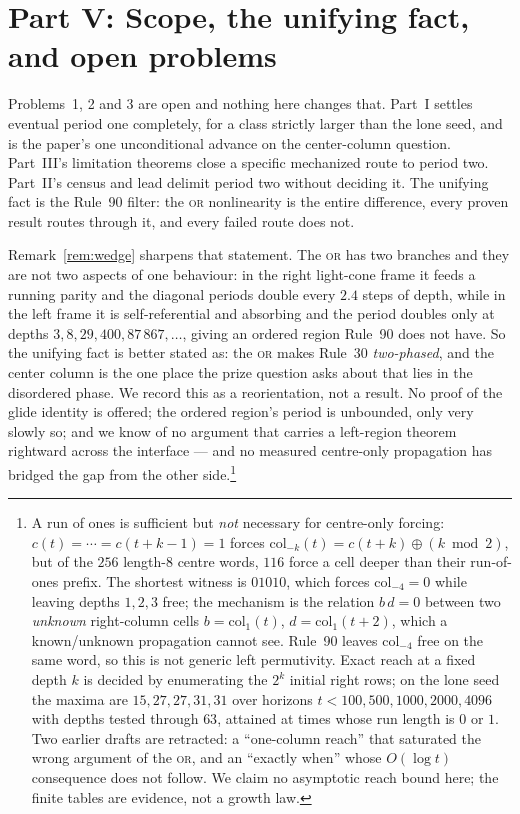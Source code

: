 \documentclass[11pt]{article}
\theoremstyle{definition}
\begin{document}
\section{Part V: Scope, the unifying fact, and open problems}
\label{sec:scope}

Problems~1, 2 and 3 are open and nothing here changes that. Part~I settles
eventual period one completely, for a class strictly larger than the lone seed,
and is the paper's one unconditional advance on the center-column question.
Part~III's limitation theorems close a specific mechanized route to period two.
Part~II's census and lead delimit period two without deciding it. The unifying
fact is the Rule~90 filter: the \textsc{or} nonlinearity is the entire
difference, every proven result routes through it, and every failed route does
not.

Remark~\ref{rem:wedge} sharpens that statement. The \textsc{or} has two branches
and they are not two aspects of one behaviour: in the right light-cone frame it
feeds a running parity and the diagonal periods double every $2.4$ steps of
depth, while in the left frame it is self-referential and absorbing and the
period doubles only at depths $3,8,29,400,87\,867,\ldots$, giving an ordered
region Rule~90 does not have. So the unifying fact is better stated as: the
\textsc{or} makes Rule~30 \emph{two-phased}, and the center column is the one
place the prize question asks about that lies in the disordered phase. We record
this as a reorientation, not a result. No proof of the glide identity is offered;
the ordered region's period is unbounded, only very slowly so; and we know of no
argument that carries a left-region theorem rightward across the interface --- and
no measured centre-only propagation has bridged the gap from the other
side.\footnote{A run of ones is sufficient but \emph{not} necessary for
centre-only forcing: $c(t)=\cdots=c(t+k-1)=1$ forces
$\mathrm{col}_{-k}(t)=c(t+k)\oplus(k\bmod 2)$, but of the $256$ length-$8$
centre words, $116$ force a cell deeper than their run-of-ones prefix. The
shortest witness is $01010$, which forces $\mathrm{col}_{-4}=0$ while leaving
depths $1,2,3$ free; the mechanism is the relation $b\,d=0$ between two
\emph{unknown} right-column cells $b=\mathrm{col}_1(t)$, $d=\mathrm{col}_1(t+2)$,
which a known/unknown propagation cannot see. Rule~90 leaves
$\mathrm{col}_{-4}$ free on the same word, so this is not generic left
permutivity. Exact reach at a fixed depth $k$ is decided by enumerating the
$2^k$ initial right rows; on the lone seed the maxima are $15,27,27,31,31$ over
horizons $t<100,500,1000,2000,4096$ with depths tested through $63$, attained at
times whose run length is $0$ or $1$. Two earlier drafts are retracted: a
``one-column reach'' that saturated the wrong argument of the \textsc{or}, and
an ``exactly when'' whose $O(\log t)$ consequence does not follow. We claim no
asymptotic reach bound here; the finite tables are evidence, not a growth law.}
\end{document}
